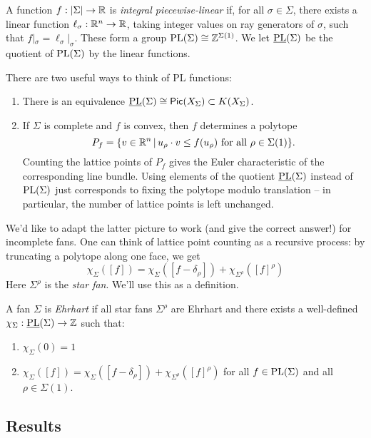 \documentclass{amsart}
\begin{document}
\begin{dfn}
	A function $f: |\Sigma| \to \mathbb{R}$ is \emph{integral piecewise-linear} if, for all $\sigma \in \Sigma$, there exists a linear function $\ell_\sigma: \mathbb{R}^n \to \mathbb{R}$, taking integer values on ray generators of $\sigma$, such that $f|_\sigma = \ell_\sigma|_\sigma$.
	These form a group $\operatorname{PL}(\Sigma) \cong \mathbb{Z}^{\Sigma(1)}$.
	We let $\underline{\operatorname{PL}}(\Sigma)$ be the quotient of $\operatorname{PL}(\Sigma)$ by the linear functions.
\end{dfn}

There are two useful ways to think of PL functions:
\begin{enumerate}
	\item There is an equivalence $\underline{\operatorname{PL}}(\Sigma) \cong \mathsf{Pic}(X_\Sigma) \subset K(X_\Sigma)$.
	\item If $\Sigma$ is complete and $f$ is convex, then $f$ determines a polytope
		\[
			P_f = \{ v \in \mathbb{R}^n \,|\, u_\rho \cdot v \leq f(u_\rho) \textrm{ for all } \rho \in \Sigma(1) \}.
		\]
		Counting the lattice points of $P_f$ gives the Euler characteristic of the corresponding line bundle.
		Using elements of the quotient $\underline{\operatorname{PL}}(\Sigma)$ instead of $\operatorname{PL}(\Sigma)$ just corresponds to fixing the polytope modulo translation -- in particular, the number of lattice points is left unchanged.
\end{enumerate}

We'd like to adapt the latter picture to work (and give the correct answer!) for incomplete fans.
One can think of lattice point counting as a recursive process: by truncating a polytope along one face, we get
\[
	\chi_\Sigma([f]) = \chi_\Sigma([f - \delta_\rho]) + \chi_{\Sigma^\rho}([f]^\rho)
\]
Here $\Sigma^\rho$ is the \emph{star fan}.
We'll use this as a definition.

\begin{dfn}
	A fan $\Sigma$ is \emph{Ehrhart} if all star fans $\Sigma^\rho$ are Ehrhart and there exists a well-defined $\chi_\Sigma: \underline{\operatorname{PL}}(\Sigma) \to \mathbb{Z}$ such that:
	\begin{enumerate}
		\item $\chi_\Sigma(0) = 1$
		\item $\chi_\Sigma([f]) = \chi_\Sigma([f - \delta_\rho]) + \chi_{\Sigma^\rho}([f]^\rho)$ for all $f \in \operatorname{PL}(\Sigma)$ and all $\rho \in \Sigma(1)$.
	\end{enumerate}
\end{dfn}

\subsection{Results}
\end{document}
